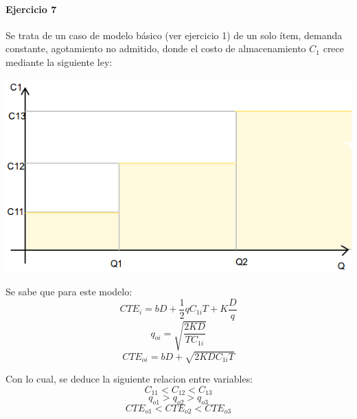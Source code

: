 \documentclass{article}
\begin{document}
\paragraph{Ejercicio 7}
Se trata de un caso de modelo básico (ver ejercicio 1) de un solo ítem, demanda constante, agotamiento no admitido, donde el costo de almacenamiento $C_{1}$ crece mediante la siguiente ley:
\begin{center}
  \includegraphics[scale=0.4,keepaspectratio=true]{img/7/7_QvsC1.png} 
\end{center}
Se sabe que para este modelo:
  \begin{equation}\label{7_CTE}CTE_i = bD + \frac{1}{2}qC_{1i}T + K\frac{D}{q} \end{equation}
  $$ q_{oi} = \sqrt{ \frac{2KD}{TC_{1i}}} $$
  $$ CTE_{oi} = bD + \sqrt{ 2KDC_{1i}T }$$

Con lo cual, se deduce la siguiente relacion entre variables:
 $$ C_{11} < C_{12} < C_{13} $$
 $$ q_{o1} > q_{o2} > q_{o3}$$
 $$ CTE_{o1} < CTE_{o2} < CTE_{o3} $$
 
\end{document}

